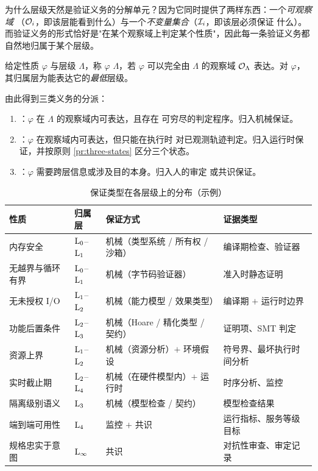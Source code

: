 为什么层级天然是验证义务的分解单元？因为它同时提供了两样东西：一个\emph{可观察域}
（$\mathcal{O}_i$，即该层能看到什么）与一个\emph{不变量集合}（$\mathcal{I}_i$，即该层必须保证
什么）。而验证义务的形式恰好是"在某个观察域上判定某个性质"，因此每一条验证义务都
自然地归属于某个层级。

\begin{definition}[验证义务的层级归属]\label{def:obligation-assign}
给定性质 $\varphi$ 与层级 $\Lambda$，称 $\varphi$  $\Lambda$，若
$\varphi$ 可以完全由 $\Lambda$ 的观察域 $\mathcal{O}_\Lambda$ 表达。对 $\varphi$，
其归属层为能表达它的\emph{最低}层级。
\end{definition}

由此得到三类义务的分派：

\begin{enumerate}[label=(\alph*)]
\item {}：$\varphi$ 在 $\Lambda$ 的观察域内可表达，且存在
      可穷尽的判定程序。归入机械保证。
\item {}：$\varphi$ 在观察域内可表达，但只能在执行时
      对已观测轨迹判定。归入运行时保证，并按原则 \ref{pr:three-states} 区分三个状态。
\item {}：$\varphi$ 需要跨层信息或涉及目的本身。归入人的审定
      或共识保证。
\end{enumerate}

\begin{table}[htbp]
\centering
\footnotesize
\caption{保证类型在各层级上的分布（示例）}\label{tab:assurance-matrix}
\begin{tabular}{L{4.2cm}L{3.2cm}L{3.2cm}L{3.6cm}}
\toprule
\textbf{性质} & \textbf{归属层} & \textbf{保证方式} & \textbf{证据类型} \\
\midrule
内存安全 & $\mathrm{L}_{0}$--$\mathrm{L}_{1}$ & 机械（类型系统 / 所有权 / 沙箱） & 编译期检查、验证器 \\
无越界与循环有界 & $\mathrm{L}_{0}$--$\mathrm{L}_{1}$ & 机械（字节码验证器） & 准入时静态证明 \\
无未授权 I/O & $\mathrm{L}_{1}$--$\mathrm{L}_{2}$ & 机械（能力模型 / 效果类型） & 编译期 $+$ 运行时边界 \\
功能后置条件 & $\mathrm{L}_{2}$--$\mathrm{L}_{3}$ & 机械（Hoare / 精化类型 / 契约） & 证明项、SMT 判定 \\
资源上界 & $\mathrm{L}_{1}$--$\mathrm{L}_{2}$ & 机械（资源分析）$+$ 环境假设 & 符号界、最坏执行时间分析 \\
实时截止期 & $\mathrm{L}_{2}$--$\mathrm{L}_{4}$ & 机械（在硬件模型内）$+$ 运行时 & 时序分析、监控 \\
隔离级别语义 & $\mathrm{L}_{3}$ & 机械（模型检查 / 契约） & 模型检查结果 \\
端到端可用性 & $\mathrm{L}_{4}$ & 监控 $+$ 共识 & 运行指标、服务等级目标 \\
规格忠实于意图 & $\mathrm{L}_{\infty}$ & 共识 & 对抗性审查、审定记录 \\
\bottomrule
\end{tabular}
\end{table}

